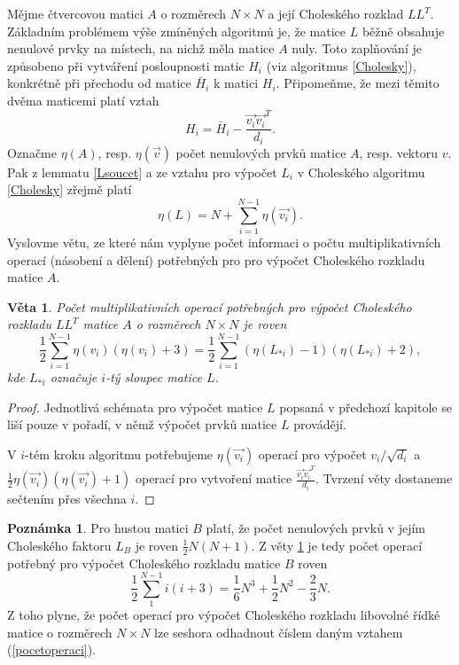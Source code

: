 \documentclass[11pt,american,czech,oneside]{book}
\theoremstyle{plain}
\newtheorem{theorem}{Věta}
\theoremstyle{definition}
\newtheorem{remark}{Poznámka}
\begin{document}
Mějme čtvercovou matici $A$ o rozměrech $N\times N$ a její Choleského rozklad $LL^T$. Základním problémem výše zmíněných algoritmů je, že matice $L$ běžně obsahuje nenulové prvky na místech, na nichž měla matice $A$ nuly. Toto zaplňování je způsobeno při vytváření posloupnosti matic $H_i$ (viz algoritmus \ref{Cholesky}), konkrétně při přechodu od matice $\bar{H}_i$ k matici $H_i$. Připomeňme, že mezi těmito dvěma maticemi platí vztah
\[
H_i = \bar{H}_i - \frac{\vec{v_i}\vec{v_i}^T}{d_i}.
\]
Označme $\eta(A)$, resp. $\eta(\vec{v})$ počet nenulových prvků matice $A$, resp. vektoru $v$. Pak z lemmatu \ref{Lsoucet} a ze vztahu pro výpočet $L_i$ v Choleského algoritmu \ref{Cholesky} zřejmě platí
\[
\eta(L) = N + \sum_{i=1}^{N-1}\eta(\vec{v_i}).
\]
Vyslovme větu, ze které nám vyplyne počet informaci o počtu multiplikativních operací (násobení a dělení) potřebných pro pro výpočet Choleského rozkladu matice $A$.
\begin{theorem}
\label{Cholesky_operace}
  Počet multiplikativních operací potřebných pro výpočet Choleského rozkladu $LL^T$ matice $A$ o rozměrech $N \times N$ je roven
  \[
  \frac12\sum_{i=1}^{N-1}\eta(v_i)\left(\eta(v_i)+3\right)=
  \frac12\sum_{i=1}^{N-1}\left(\eta(L_{*i})-1\right)\left(\eta(L_{*i})+2\right),
  \]
  kde $L_{*i}$ označuje $i$-tý sloupec matice $L$.
\end{theorem}
\begin{proof}
  Jednotlivá schémata pro výpočet matice $L$ popsaná v předchozí kapitole se liší pouze v pořadí, v němž výpočet prvků matice $L$ provádějí.

  V $i$-tém kroku algoritmu potřebujeme $\eta(\vec{v_i})$ operací pro výpočet $v_i/\sqrt{d_i}$ a $\frac12\eta(\vec{v_i})\left(\eta(\vec{v_i})+1\right)$ operací pro vytvoření matice $\frac{\vec{v_i}\vec{v_i}^T}{d_i}$. Tvrzení věty dostaneme sečtením přes všechna $i$.
\end{proof}

\begin{remark}
Pro hustou matici $B$ platí, že počet nenulových prvků v jejím Choleského faktoru $L_B$ je roven $\frac12 N(N+1)$.
Z věty \ref{Cholesky_operace} je tedy počet operací potřebný pro výpočet Choleského rozkladu matice $B$ roven
\begin{equation}\label{pocetoperaci}
  \frac12 \sum_{1}^{N-1}i(i+3) = \frac16 N^3 + \frac12 N^2 - \frac23 N.
\end{equation}
Z toho plyne, že počet operací pro výpočet Choleského rozkladu libovolné řídké matice o rozměrech $N \times N $ lze seshora odhadnout číslem daným vztahem (\ref{pocetoperaci}).
\end{remark}
\end{document}
